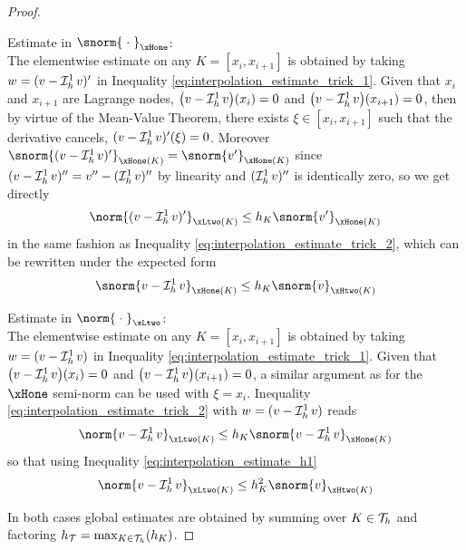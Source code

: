 \begin{proof}
\medskip
\begin{tmaproofitems}
\item Estimate in $\snorm{\;\cdot\;}_{\xHone}$:\\
The elementwise estimate on any $K = [x_{i}, x_{i+1}]$ is obtained by taking $w = (v - \mathop{\mathcal{I}_{h}^{1}}v)'$ in Inequality \eqref{eq:interpolation_estimate_trick_1}.
Given that $x_i$ and $x_{i+1}$ are Lagrange nodes, $\bigl(v-\mathop{\mathcal{I}_{h}^{1}}v\bigr)(x_i) = 0$ and $\bigl(v-\mathop{\mathcal{I}_{h}^{1}}v\bigr)(x_{i+1}) = 0$, then by virtue of the Mean-Value Theorem, there exists $\xi\in[x_{i}, x_{i+1}]$ such that the derivative cancels, $(v-\mathop{\mathcal{I}_{h}^{1}}v)'(\xi) = 0$.
Moreover $\snorm{(v-\Lgrh{1}v)'}_{\xHone(K)} = \snorm{v'}_{\xHone(K)}$ since $(v-\mathop{\mathcal{I}_{h}^{1}}v)'' = v'' - (\mathop{\mathcal{I}_{h}^{1}}v)''$ by linearity and $(\mathop{\mathcal{I}_{h}^{1}}v)''$ is identically zero, so we get directly
\begin{equation*}
\norm{(v-\Lgrh{1}v)'}_{\xLtwo(K)} \leq h_K\snorm{v'}_{\xHone(K)}
\end{equation*}
in the same fashion as Inequality \eqref{eq:interpolation_estimate_trick_2}, which can be rewritten under the expected form
\begin{equation}\label{eq:interpolation_estimate_h1}
\snorm{v-\Lgrh{1}v}_{\xHone(K)} \leq h_K\snorm{v}_{\xHtwo(K)}
\end{equation}
\item Estimate in $\norm{\;\cdot\;}_{\xLtwo}$:\\
The elementwise estimate on any $K = [x_{i}, x_{i+1}]$ is obtained by taking $w = (v - \mathop{\mathcal{I}_{h}^{1}}v)$ in Inequality \eqref{eq:interpolation_estimate_trick_1}.
Given that $\bigl(v-\mathop{\mathcal{I}_{h}^{1}}v\bigr)(x_i) = 0$ and $\bigl(v-\mathop{\mathcal{I}_{h}^{1}}v\bigr)(x_{i+1}) = 0$, a similar argument as for the $\xHone$ semi-norm can be used with $\xi = x_i$.
Inequality \eqref{eq:interpolation_estimate_trick_2} with $w = (v - \mathop{\mathcal{I}_{h}^{1}}v)$ reads
\begin{equation*}
\norm{v-\Lgrh{1}v}_{\xLtwo(K)} \leq h_K\snorm{v-\Lgrh{1}v}_{\xHone(K)}
\end{equation*}
so that using Inequality \eqref{eq:interpolation_estimate_h1}
\begin{equation*}
\norm{v-\Lgrh{1}v}_{\xLtwo(K)} \leq h^2_K\snorm{v}_{\xHtwo(K)}
\end{equation*}
\end{tmaproofitems}
In both cases global estimates are obtained by summing over $K\in{\mathcal T}_h$ and factoring $h_{\mathcal T} = \max_{K\in{\mathcal T}_h}(h_K)$.
\end{proof}

